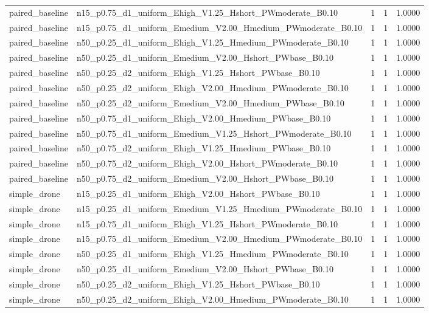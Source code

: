 \begin{tabular}{llrrr}
paired_baseline & n15_p0.75_d1_uniform_Ehigh_V1.25_Hshort_PWmoderate_B0.10 & 1 & 1 & 1.0000 \\
paired_baseline & n15_p0.75_d1_uniform_Emedium_V2.00_Hmedium_PWmoderate_B0.10 & 1 & 1 & 1.0000 \\
paired_baseline & n50_p0.25_d1_uniform_Ehigh_V1.25_Hmedium_PWmoderate_B0.10 & 1 & 1 & 1.0000 \\
paired_baseline & n50_p0.25_d1_uniform_Emedium_V2.00_Hshort_PWbase_B0.10 & 1 & 1 & 1.0000 \\
paired_baseline & n50_p0.25_d2_uniform_Ehigh_V1.25_Hshort_PWbase_B0.10 & 1 & 1 & 1.0000 \\
paired_baseline & n50_p0.25_d2_uniform_Ehigh_V2.00_Hmedium_PWmoderate_B0.10 & 1 & 1 & 1.0000 \\
paired_baseline & n50_p0.25_d2_uniform_Emedium_V2.00_Hmedium_PWbase_B0.10 & 1 & 1 & 1.0000 \\
paired_baseline & n50_p0.75_d1_uniform_Ehigh_V2.00_Hmedium_PWbase_B0.10 & 1 & 1 & 1.0000 \\
paired_baseline & n50_p0.75_d1_uniform_Emedium_V1.25_Hshort_PWmoderate_B0.10 & 1 & 1 & 1.0000 \\
paired_baseline & n50_p0.75_d2_uniform_Ehigh_V1.25_Hmedium_PWbase_B0.10 & 1 & 1 & 1.0000 \\
paired_baseline & n50_p0.75_d2_uniform_Ehigh_V2.00_Hshort_PWmoderate_B0.10 & 1 & 1 & 1.0000 \\
paired_baseline & n50_p0.75_d2_uniform_Emedium_V2.00_Hshort_PWbase_B0.10 & 1 & 1 & 1.0000 \\
simple_drone & n15_p0.25_d1_uniform_Ehigh_V2.00_Hshort_PWbase_B0.10 & 1 & 1 & 1.0000 \\
simple_drone & n15_p0.25_d1_uniform_Emedium_V1.25_Hmedium_PWmoderate_B0.10 & 1 & 1 & 1.0000 \\
simple_drone & n15_p0.75_d1_uniform_Ehigh_V1.25_Hshort_PWmoderate_B0.10 & 1 & 1 & 1.0000 \\
simple_drone & n15_p0.75_d1_uniform_Emedium_V2.00_Hmedium_PWmoderate_B0.10 & 1 & 1 & 1.0000 \\
simple_drone & n50_p0.25_d1_uniform_Ehigh_V1.25_Hmedium_PWmoderate_B0.10 & 1 & 1 & 1.0000 \\
simple_drone & n50_p0.25_d1_uniform_Emedium_V2.00_Hshort_PWbase_B0.10 & 1 & 1 & 1.0000 \\
simple_drone & n50_p0.25_d2_uniform_Ehigh_V1.25_Hshort_PWbase_B0.10 & 1 & 1 & 1.0000 \\
simple_drone & n50_p0.25_d2_uniform_Ehigh_V2.00_Hmedium_PWmoderate_B0.10 & 1 & 1 & 1.0000 \\

\end{tabular}

